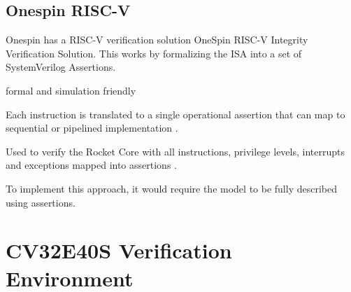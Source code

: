 %
%        
%     
%        
%     
%     
%

\subsection{Onespin RISC-V}

Onespin has a RISC-V verification solution OneSpin RISC-V Integrity Verification Solution. \cite{onespinsolutionsAssuringIntegrityRISCV2019} 
This works by formalizing the ISA into a set of SystemVerilog Assertions.

formal and simulation friendly

Each instruction is translated to a single operational assertion that can map to sequential or pipelined implementation \cite{onespinsolutionsAssuringIntegrityRISCV2019}.

Used to verify the Rocket Core with all instructions, privilege levels, interrupts and exceptions mapped into assertions \cite{onespinsolutionsAssuringIntegrityRISCV2019}.

To implement this approach, it would require the model to be fully described using assertions.




\section{CV32E40S Verification Environment}
\label{sec:bg_core-v-verif}

